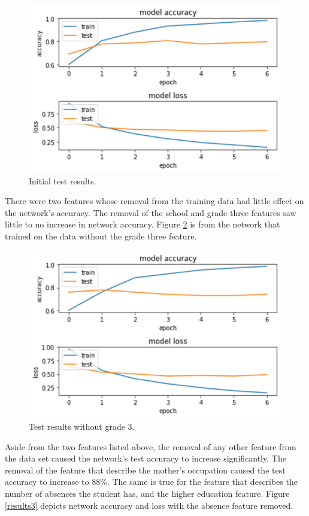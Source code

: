 \documentclass[conference]{IEEEtran}
\begin{document}
\begin{figure}[htbp]
\centerline{\includegraphics[width=\linewidth]{results1.png}}
\caption{Initial test results.}
\label{results1}
\end{figure}

There were two features whose removal from the training data had little effect on the network’s accuracy. The removal of the school and grade three features saw little to no increase in network accuracy. Figure \ref{results2} is from the network that trained on the data without the grade three feature.

\begin{figure}[htbp]
\centerline{\includegraphics[width=\linewidth]{results2.png}}
\caption{Test results without grade 3.}
\label{results2}
\end{figure}

Aside from the two features listed above, the removal of any other feature from the data set caused the network’s test accuracy to increase significantly. The removal of the feature that describe the mother’s occupation caused the test accuracy to increase to 88\%. The same is true for the feature that describes the number of absences the student has, and the higher education feature. Figure \ref{results3} depicts network accuracy and loss with the absence feature removed.
\end{document}
